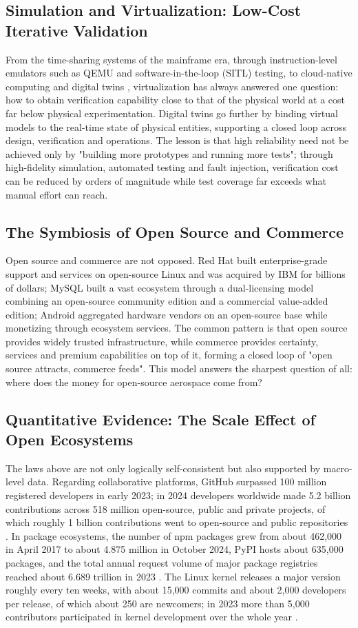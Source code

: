 \documentclass[11pt]{article}
\begin{document}
\subsection{Simulation and Virtualization: Low-Cost Iterative Validation}
From the time-sharing systems of the mainframe era, through instruction-level emulators such as QEMU and software-in-the-loop (SITL) testing, to cloud-native computing and digital twins \cite{glaessgen2012,grieves2017}, virtualization has always answered one question: how to obtain verification capability close to that of the physical world at a cost far below physical experimentation. Digital twins go further by binding virtual models to the real-time state of physical entities, supporting a closed loop across design, verification and operations. The lesson is that high reliability need not be achieved only by "building more prototypes and running more tests"; through high-fidelity simulation, automated testing and fault injection, verification cost can be reduced by orders of magnitude while test coverage far exceeds what manual effort can reach.

\subsection{The Symbiosis of Open Source and Commerce}
Open source and commerce are not opposed. Red Hat built enterprise-grade support and services on open-source Linux and was acquired by IBM for billions of dollars; MySQL built a vast ecosystem through a dual-licensing model combining an open-source community edition and a commercial value-added edition; Android aggregated hardware vendors on an open-source base while monetizing through ecosystem services. The common pattern is that open source provides widely trusted infrastructure, while commerce provides certainty, services and premium capabilities on top of it, forming a closed loop of "open source attracts, commerce feeds". This model answers the sharpest question of all: where does the money for open-source aerospace come from?

\subsection{Quantitative Evidence: The Scale Effect of Open Ecosystems}
The laws above are not only logically self-consistent but also supported by macro-level data. Regarding collaborative platforms, GitHub surpassed 100 million registered developers in early 2023; in 2024 developers worldwide made 5.2 billion contributions across 518 million open-source, public and private projects, of which roughly 1 billion contributions went to open-source and public repositories \cite{octoverse2024}. In package ecosystems, the number of npm packages grew from about 462,000 in April 2017 to about 4.875 million in October 2024, PyPI hosts about 635,000 packages, and the total annual request volume of major package registries reached about 6.689 trillion in 2023 \cite{sonatype2024}. The Linux kernel releases a major version roughly every ten weeks, with about 15,000 commits and about 2,000 developers per release, of which about 250 are newcomers; in 2023 more than 5,000 contributors participated in kernel development over the whole year \cite{lwn2023}.
\end{document}
